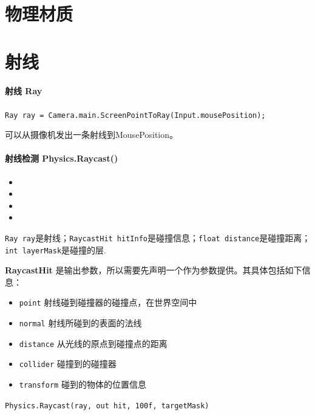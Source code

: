 \documentclass[UTF8,a4paper,12pt]{ctexbook}
\begin{document}
	\section{物理材质}
	
	\section{射线}
		\paragraph{射线 Ray}
			\verb|Ray ray = Camera.main.ScreenPointToRay(Input.mousePosition);|
			
			可以从摄像机发出一条射线到MousePosition。
			
			
		\paragraph{射线检测 Physics.Raycast()}
			\begin{itemize}[itemindent = 1em]
				\item {}
				\item {}
				\item {}
				\item {}
			\end{itemize}
			
			\verb|Ray ray|是射线；\verb|RaycastHit hitInfo|是碰撞信息；\verb|float distance|是碰撞距离；\verb|int layerMask|是碰撞的层.
			
			\textbf{RaycastHit} 是输出参数，所以需要先声明一个作为参数提供。其具体包括如下信息：
			\begin{itemize}[itemindent = 1em]
				\item \verb|point| 射线碰到碰撞器的碰撞点，在世界空间中
				\item \verb|normal| 射线所碰到的表面的法线
				\item \verb|distance| 从光线的原点到碰撞点的距离
				\item \verb|collider| 碰撞到的碰撞器
				\item \verb|transform| 碰到的物体的位置信息
			\end{itemize}
			
			\verb|Physics.Raycast(ray, out hit, 100f, targetMask)|
			
\end{document}
